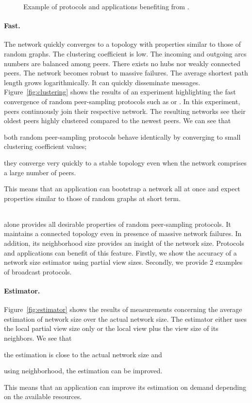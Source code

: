 \begin{figure}
\begin{center}
    \caption{Example of protocols and applications benefiting from \SPRAY.}
  \end{center}
\end{figure}






\paragraph{Fast.}
The network quickly converges to a topology with properties similar to those of
random graphs. The clustering coefficient is low. The incoming and outgoing arcs
numbers are balanced among peers. There exists no hubs nor weakly connected
peers. The network becomes robust to massive failures. The average shortest path
length grows logarithmically. It can quickly disseminate messages. \\
Figure~\ref{fig:clustering} shows the results of an experiment highlighting the
fast convergence of random peer-sampling protocols such as \SPRAY or \CYCLON. In
this experiment, peers continuously join their respective network. The resulting
networks see their oldest peers highly clustered compared to the newest
peers. We can see that
\begin{inparaenum}[(i)]
\item both random peer-sampling protocols behave identically by converging to
  small clustering coefficient values;
\item they converge very quickly to a stable topology even when the network
  comprises a large number of peers.
\end{inparaenum}
This means that an application can bootstrap a network all at once and expect
properties similar to those of random graphs at short term.

\ \\ \indent \SPRAY alone provides all desirable properties of random peer-sampling
protocols. It maintains a connected topology even in presence of massive network
failures. In addition, its neighborhood size provides an insight of the network
size. Protocols and applications can benefit of this feature. Firstly, we show
the accuracy of a network size estimator using partial view sizes. Secondly, we
provide 2 examples of broadcast protocols.

\paragraph{Estimator.} Figure~\ref{fig:estimator} shows the results of
measurements concerning the average estimation of network size over the actual
network size. The estimator either uses the local partial view size only or the
local view plus the view size of its neighbors. We see that
\begin{inparaenum}[(i)]
\item the estimation is close to the actual network size and
\item using neighborhood, the estimation can be improved.
\end{inparaenum}
This means that an application can improve its estimation on demand depending on
the available resources.


